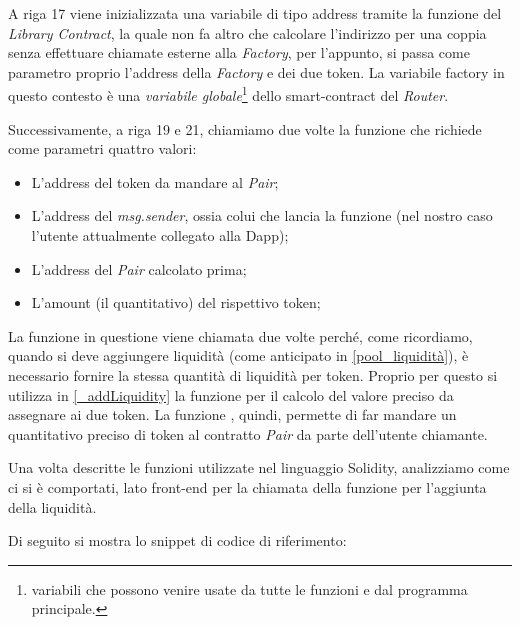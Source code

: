 A riga 17 viene inizializzata una variabile di tipo address tramite la funzione  del \textit{Library Contract}, la quale non fa altro che calcolare l'indirizzo per una coppia senza effettuare chiamate esterne alla \textit{Factory}, per l'appunto, si passa come parametro proprio l'address della \textit{Factory} e dei due token. La variabile factory in questo contesto è una \textit{variabile globale}\footnote{variabili che possono venire usate da tutte le funzioni e dal programma principale.} dello smart-contract del \textit{Router}.

Successivamente, a riga 19 e 21, chiamiamo due volte la funzione  che richiede come parametri quattro valori:

\begin{itemize}
\item L'address del token da mandare al \textit{Pair};
\item L'address del \textit{msg.sender}, ossia colui che lancia la funzione (nel nostro caso l'utente attualmente collegato alla Dapp);
\item L'address del \textit{Pair} calcolato prima;
\item L'amount (il quantitativo) del rispettivo token;
\end{itemize}

La funzione in questione viene chiamata due volte perché, come ricordiamo, quando si deve aggiungere liquidità (come anticipato in \ref{pool_liquidità}), è necessario fornire la stessa quantità di liquidità per token. Proprio per questo si utilizza in \ref{_addLiquidity} la funzione  per il calcolo del valore preciso da assegnare ai due token.
La funzione , quindi, permette di far mandare un quantitativo preciso di token al contratto \textit{Pair} da parte dell'utente chiamante.

Una volta descritte le funzioni utilizzate nel linguaggio Solidity, analizziamo come ci si è comportati, lato front-end per la chiamata della funzione per l'aggiunta della liquidità.

Di seguito si mostra lo snippet di codice di riferimento:\\


